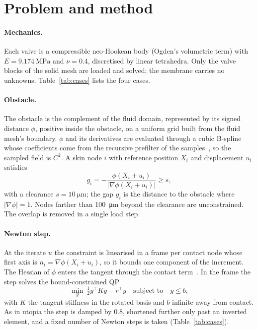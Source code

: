 \documentclass[sigconf,nonacm]{acmart}
\begin{document}
\section{Problem and method}
\label{sec:problem}

\paragraph{Mechanics.} Each valve is a compressible neo-Hookean body (Ogden's volumetric term)
with $E=\SI{9.174}{\mega\pascal}$ and $\nu=0.4$, discretised by linear tetrahedra. Only the valve
blocks of the solid mesh are loaded and solved; the membrane carries no unknowns.
Table~\ref{tab:cases} lists the four cases.

\paragraph{Obstacle.} The obstacle is the complement of the fluid domain, represented by its
signed distance $\phi$, positive inside the obstacle, on a uniform grid built from the fluid
mesh's boundary. $\phi$ and its derivatives are evaluated through a cubic B-spline whose
coefficients come from the recursive prefilter of the samples~\cite{unser1999}, so the sampled
field is $C^2$. A skin node $i$ with reference position $X_i$ and displacement $u_i$ satisfies
\begin{equation}
  g_i = -\frac{\phi(X_i + u_i)}{|\nabla\phi(X_i + u_i)|} \ge s ,
\end{equation}
with a clearance $s=\SI{10}{\micro\metre}$; the gap $g_i$ is the distance to the obstacle where
$|\nabla\phi| = 1$. Nodes farther than \SI{100}{\micro\metre} beyond the clearance are
unconstrained. The overlap is removed in a single load step.

\paragraph{Newton step.} At the iterate $u$ the constraint is linearised in a frame per contact
node whose first axis is $n_i=\nabla\phi(X_i+u_i)$, so it bounds one component of the increment.
The Hessian of $\phi$ enters the tangent through the contact term~\cite{wriggers2006}. In the frame
the step solves the bound-constrained QP
\begin{equation}
  \min_{y}\ \tfrac12 y^\top K y - r^\top y \quad \text{subject to}\quad y \le b ,
\end{equation}
with $K$ the tangent stiffness in the rotated basis and $b$ infinite away from contact. As in
utopia the step is damped by $0.8$, shortened further only past an inverted element, and a fixed
number of Newton steps is taken (Table~\ref{tab:cases}).
\end{document}
